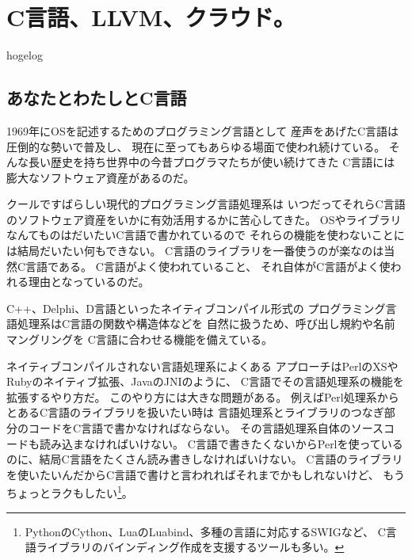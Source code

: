
\chapter{C言語、LLVM、クラウド。}

\begin{flushright}
 {\headfont hogelog}
\end{flushright}

\section{あなたとわたしとC言語}
1969年にOSを記述するためのプログラミング言語として
産声をあげたC言語は圧倒的な勢いで普及し、
現在に至ってもあらゆる場面で使われ続けている。
そんな長い歴史を持ち世界中の今昔プログラマたちが使い続けてきた
C言語には膨大なソフトウェア資産があるのだ。

クールですばらしい現代的プログラミング言語処理系は
いつだってそれらC言語のソフトウェア資産をいかに有効活用するかに苦心してきた。
OSやライブラリなんてものはだいたいC言語で書かれているので
それらの機能を使わないことには結局だいたい何もできない。
C言語のライブラリを一番使うのが楽なのは当然C言語である。
C言語がよく使われていること、
それ自体がC言語がよく使われる理由となっているのだ。

C++、Delphi、D言語といったネイティブコンパイル形式の
プログラミング言語処理系はC言語の関数や構造体などを
自然に扱うため、呼び出し規約や名前マングリングを
C言語に合わせる機能を備えている。

ネイティブコンパイルされない言語処理系によくある
アプローチはPerlのXSやRubyのネイティブ拡張、JavaのJNIのように、
C言語でその言語処理系の機能を拡張するやり方だ。
このやり方には大きな問題がある。
例えばPerl処理系からとあるC言語のライブラリを扱いたい時は
言語処理系とライブラリのつなぎ部分のコードをC言語で書かなければならない。
その言語処理系自体のソースコードも読み込まなければいけない。
C言語で書きたくないからPerlを使っているのに、結局C言語をたくさん読み書きしなければいけない。
C言語のライブラリを使いたいんだからC言語で書けと言われればそれまでかもしれないけど、
もうちょっとラクもしたい\footnote{
PythonのCython、LuaのLuabind、多種の言語に対応するSWIGなど、
C言語ライブラリのバインディング作成を支援するツールも多い。}。

